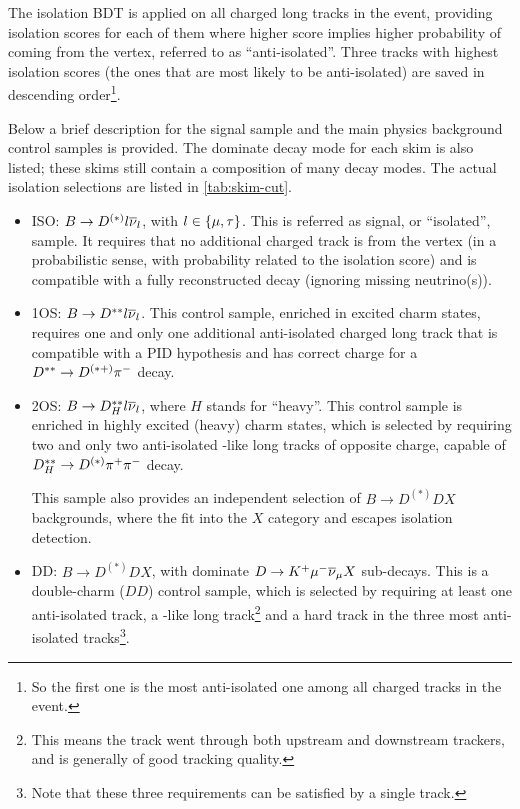 The isolation BDT is applied on all charged long tracks in the event,
providing isolation scores for each of them where higher score implies higher
probability of coming from the \B vertex,
referred to as ``anti-isolated''.
Three tracks with highest isolation scores
(the ones that are most likely to be anti-isolated)
are saved in descending order\footnote{
    So the first one is the most anti-isolated one among all charged tracks
    in the event.
}.


Below a brief description for the signal sample and the main physics background
control samples is provided.
The dominate decay mode for each skim is also listed; these skims still contain
a composition of many decay modes.
The actual isolation selections are listed in \cref{tab:skim-cut}.

\begin{itemize}
    \item ISO: $B \rightarrow D^{(*)} {l} {{\overline{\nu}}_l}$, with ${l} \in \{{\mu},
        {\tau}\}$.
        This is referred as signal, or ``isolated'', sample.
        It requires that no additional charged track is from the \B vertex
        (in a probabilistic sense, with probability related to the isolation
        score)
        and is compatible with a fully reconstructed \B decay
        (ignoring missing neutrino(s)).

    \item 1OS: $B \rightarrow D^{**} {l} {{\overline{\nu}}_l}$.
        This control sample, enriched in excited charm states,
        requires one and only one additional anti-isolated charged long track
        that is compatible with a \pion PID hypothesis and has correct charge
        for a $D^{**} \rightarrow D^{(*+)}{{\pi}^-}$ decay.

    \item 2OS: $B \rightarrow D^{**}_H {l} {{\overline{\nu}}_l}$,
        where $H$ stands for ``heavy''.
        This control sample is enriched in highly excited (heavy) charm states,
        which is selected by requiring two and only two anti-isolated \pion-like
        long tracks of opposite charge,
        capable of $D^{**}_H \rightarrow D^{(*)} {{\pi}^+}{{\pi}^-}$ decay.

        This sample also provides an independent selection of
        $B \rightarrow D^{(*)}D X$ backgrounds, where the \pip\pim fit into the
        $X$ category and \kaon escapes isolation detection.

    \item DD: $B \rightarrow D^{(*)}D X$,
        with dominate $D \rightarrow {\ensuremath{{K}^+}} {\ensuremath{\mu^-}} {\ensuremath{{\overline{\nu}}_\mu}} X$ sub-decays.
        This is a double-charm ($DD$) control sample,
        which is selected by requiring at least one anti-isolated track,
        a \kaon-like long track\footnote{
            This means the track went through both upstream and downstream
            trackers, and is generally of good tracking quality.
        } and a hard track in the three most anti-isolated tracks\footnote{
            Note that these three requirements can be satisfied by a single
            track.
        }.
\end{itemize}


